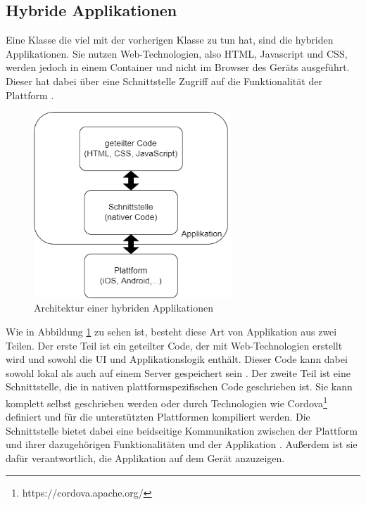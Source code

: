 \subsection{Hybride Applikationen}
\label{cha:3_hybrid}
Eine Klasse die viel mit der vorherigen Klasse zu tun hat, sind die hybriden Applikationen.
Sie nutzen Web-Technologien, also HTML, Javascript und CSS, werden jedoch in einem Container und nicht im Browser des Geräts ausgeführt.
Dieser hat dabei über eine Schnittstelle Zugriff auf die Funktionalität der Plattform \cite{IEEE_development_classes}.

\begin{figure}[ht]
  \centering
  \includegraphics[height=7cm,keepaspectratio]{images/hybrid_architecture.drawio.png} 
  \caption{Architektur einer hybriden Applikationen}
  \label{fig:hybrid_architecture}
\end{figure}

Wie in Abbildung \ref{fig:hybrid_architecture} zu sehen ist, besteht diese Art von Applikation aus zwei Teilen.
Der erste Teil ist ein geteilter Code, der mit Web-Technologien erstellt wird und sowohl die UI und Applikationslogik enthält. Dieser Code kann dabei sowohl lokal als auch auf einem Server gespeichert sein \cite{2017hybrid_approach_end}.
Der zweite Teil ist eine Schnittstelle, die in nativen plattformspezifischen Code geschrieben ist. Sie kann komplett selbst geschrieben werden oder durch Technologien wie Cordova\footnote{https://cordova.apache.org/} definiert und für die unterstützten Plattformen kompiliert werden. Die Schnittstelle bietet dabei eine beidseitige Kommunikation zwischen der Plattform und ihrer dazugehörigen Funktionalitäten und der Applikation \cite{ELKASSAS2017163}. Außerdem ist sie dafür verantwortlich, die Applikation auf dem Gerät anzuzeigen. 

